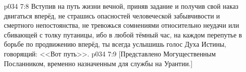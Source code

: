 \vs p034 7:8 \pc Вступив на путь жизни вечной, приняв задание и получив свой наказ двигаться вперёд, не страшись опасностей человеческой забывчивости и смертного непостоянства, не тревожься сомнениями относительно неудачи или сбивающей с толку путаницы, ибо в любой тёмный час, на каждом перепутье в борьбе по продвижению вперёд, ты всегда услышишь голос Духа Истины, говорящий: <<Вот путь>>.
\vsetoff 
\vs p034 7:9 [Представлено Могущественным Посланником, временно назначенным для службы на Урантии.]
\quizlink
